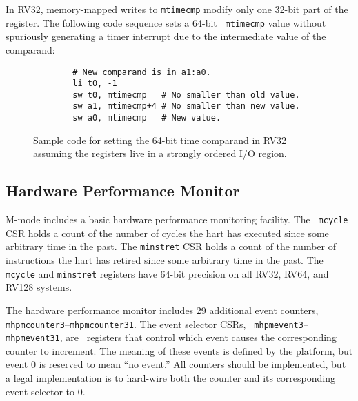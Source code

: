 In RV32, memory-mapped writes to {\tt mtimecmp} modify only one 32-bit
part of the register.  The following code sequence sets a 64-bit {\tt
  mtimecmp} value without spuriously generating a timer interrupt due
to the intermediate value of the comparand:

\begin{figure}[h!]
\begin{center}
\begin{verbatim}
        # New comparand is in a1:a0.
        li t0, -1
        sw t0, mtimecmp   # No smaller than old value.
        sw a1, mtimecmp+4 # No smaller than new value.
        sw a0, mtimecmp   # New value.
\end{verbatim}
\end{center}
\caption{Sample code for setting the 64-bit time comparand in RV32
  assuming the registers live in a strongly ordered I/O region.}
\label{mtimecmph}
\end{figure}

\subsection{Hardware Performance Monitor}

M-mode includes a basic hardware performance monitoring facility.  The {\tt
mcycle} CSR holds a count of the number of cycles the hart has executed since
some arbitrary time in the past.  The {\tt minstret} CSR holds a count of the
number of instructions the hart has retired since some arbitrary time in the
past.  The {\tt mcycle} and {\tt minstret} registers have 64-bit precision on
all RV32, RV64, and RV128 systems.

The hardware performance monitor includes 29 additional event counters, {\tt
mhpmcounter3}--{\tt mhpmcounter31}.  The event selector CSRs, {\tt
mhpmevent3}--{\tt mhpmevent31}, are \warl\ registers that control which event
causes the corresponding counter to increment.  The meaning of these events is
defined by the platform, but event 0 is reserved to mean ``no event.''
All counters should be implemented, but a legal implementation is to hard-wire
both the counter and its corresponding event selector to 0.

